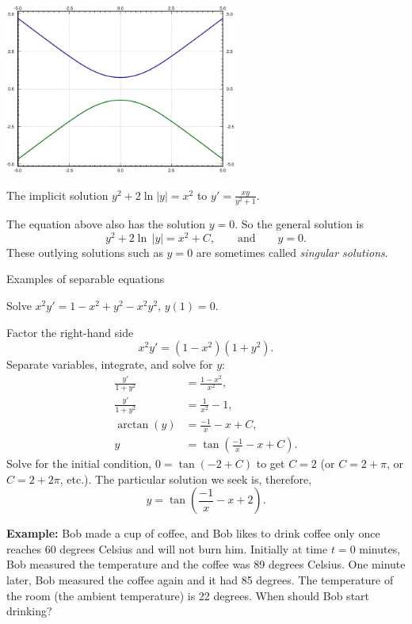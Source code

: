 \documentclass[10pt,aspectratio=169]{beamer}
\begin{document}
\begin{frame}
\includegraphics[width=3in]{../figures/implicitsols}

The implicit solution $y^2+2\ln|y|=x^2$ to $y'=\frac{xy}{y^2+1}$.


The equation above also has the solution $y=0$.
So the general solution is 
\begin{equation*}
y^2 + 2 \ln \, \lvert y \rvert = x^2 + C, \qquad \text{and} \qquad y=0.
\end{equation*}
These outlying solutions
such as $y=0$
are sometimes called \emph{singular solutions}.

{Examples of separable equations}

\begin{example}
Solve $x^2y' = 1 - x^2+y^2 - x^2y^2$, $y(1) = 0$.

Factor the right-hand side
\begin{equation*}
x^2y' = (1 - x^2)(1+y^2) .
\end{equation*}
Separate variables, integrate, and solve for $y$:
\begin{align*}
\frac{y'}{1+y^2} & = \frac{1 - x^2}{x^2} , \\
\frac{y'}{1+y^2} & = \frac{1}{x^2} - 1 , \\
\operatorname{arctan} (y) & = \frac{-1}{x} - x + C , \\
y & = \tan \left(\frac{-1}{x} - x + C\right) .
\end{align*}
Solve for the initial condition, $0 = \tan(-2+C)$ to get $C=2$ (or $C = 2 +
\pi$, or $C = 2 + 2\pi$, etc.).  The particular solution we seek is, therefore,
\begin{equation*}
y = \tan \left(\frac{-1}{x} - x + 2 \right) .
\end{equation*}
\end{example}

\textbf{Example:}
Bob made a cup of coffee, and
Bob likes to drink coffee only once reaches 60 degrees Celsius and will not burn him.
Initially at time $t=0$ minutes,
Bob measured the temperature and the coffee was 89 degrees Celsius.
One minute later, Bob measured the coffee again and it had 85 degrees.
The temperature of the room (the ambient temperature) is 22 degrees.
When should Bob start drinking?


\end{frame}
\end{document}
